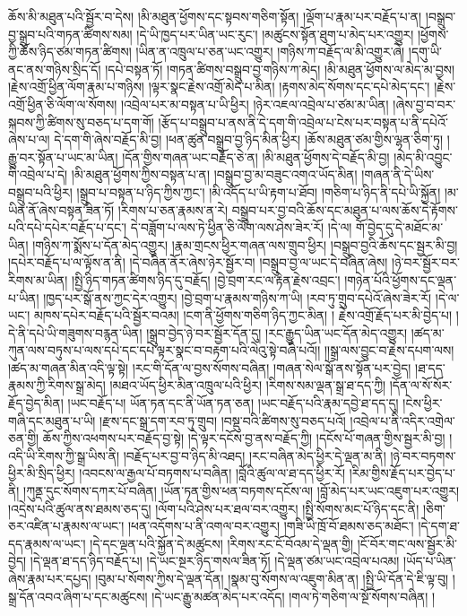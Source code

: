 ཆོས་མི་མཐུན་པའི་སྦྱོར་བ་དེས། །མི་མཐུན་ཕྱོགས་དང་སྟབས་གཅིག་སྟོན། །ལྡོག་པ་རྣམ་པར་བརྗོད་པ་ན། །བསྒྲུབ་བྱ་སྒྲུབ་པའི་གཏན་ཚིགས་སམ། །དེ་ཡི་ཁྱད་པར་ཡིན་ཡང་རུང་། །མཚུངས་སྟོན་ཐུག་པ་མེད་པར་འགྱུར། །ཕྱོགས་ཀྱི་ཆོས་ཉིད་ཙམ་གཏན་ཚིགས། །ཡིན་ན་འཁྲུལ་པ་ཅན་ཡང་འགྱུར། །གཉིས་ཀ་བརྗོད་ལ་མི་འགྱུར་ཞེ། །དགུ་ཡི་ནང་ནས་གཉིས་སྲིད་དོ། །དཔེ་བསྟན་ཏོ། །གཏན་ཚིགས་བསྒྲུབ་བྱ་གཉིས་ཀ་མེད། །མི་མཐུན་ཕྱོགས་ལ་མེད་མ་བྱས། །རྗེས་འགྲོ་ཕྱིན་ལོག་རྣམ་པ་གཉིས། །ལྟར་སྣང་རྗེས་འགྲོ་མེད་པ་མིན། །རྟགས་མེད་སོགས་དང་དཔེ་མེད་དང་། །རྗེས་འགྲོ་ཕྱིན་ཅི་ལོག་ལ་སོགས། །འབྲེལ་པར་མ་བསྟན་པ་ཡི་ཕྱིར། །ཉེར་འཇལ་འབྲེལ་པ་ཙམ་མ་ཡིན། །ཞེས་བྱ་བ་བར་སྐབས་ཀྱི་ཚིགས་སུ་བཅད་པ་དག་གོ། །རྩོད་པ་བསྒྲུབ་པ་ནས་ནི་དེ་དག་གི་འབྲེལ་པ་ངེས་པར་བསྟན་པ་ནི་དཔེའོ་ཞེས་པ་ལ། དེ་དག་གི་ཞེས་བརྗོད་མི་བྱ། །ཕན་ཚུན་བསྒྲུབ་བྱ་ཉིད་མིན་ཕྱིར། །ཆོས་མཐུན་ཙམ་གྱིས་ལྷན་ཅིག་ཏུ། །རྒྱུ་བར་སྟོན་པ་ཡང་མ་ཡིན། །དོན་གྱིས་གཞན་ཡང་བརྗོད་ཅེ་ན། །མི་མཐུན་ཕྱོགས་དེ་བརྗོད་མི་བྱ། །མེད་མི་འབྱུང་གི་འབྲེལ་པ་དེ། །མི་མཐུན་ཕྱོགས་ཀྱིས་བསྟན་པ་ན། །བསྒྲུབ་བྱ་མ་བཟུང་འགའ་ཡོད་མིན། །གཞན་ནི་དེ་ཡིས་བསྒྲུབ་པའི་ཕྱིར། །སྒྲུབ་པ་བསྟན་པ་ཉིད་ཀྱིས་ཀྱང་། །མི་འདོད་པ་ཡི་རྟག་པ་ཐོབ། །གཅིག་པ་ཉིད་ནི་དཔེ་ཡི་སྐྱོན། །མ་ཡིན་ནོ་ཞེས་བསྟན་ཟིན་ཏོ། །རིགས་པ་ཅན་རྣམས་ན་རེ། བསྒྲུབ་པར་བྱ་བའི་ཆོས་དང་མཐུན་པ་ལས་ཆོས་དེ་རྟོགས་པའི་དཔེ་དཔེར་བརྗོད་པ་དང་། དེ་བཟློག་པ་ལས་ཏེ་ཕྱིན་ཅི་ལོག་ལས་ཤེས་ཟེར་རོ། །དེ་ལ། གོ་བྱེད་དུ་དེ་མཐོང་མ་ཡིན། །གཉིས་ཀ་སྨོས་པ་དོན་མེད་འགྱུར། །རྣམ་གྲངས་ཕྱིར་གཞན་ལས་གྲུབ་ཕྱིར། །བསྒྲུབ་བྱའི་ཆོས་དང་སྦྱར་མི་བྱ། །དཔེར་བརྗོད་པ་ལ་ལྟོས་ན་ནི། །དེ་བཞིན་ནོར་ཞེས་ཉེར་སྦྱོར་བ། །བསྒྲུབ་བྱ་ལ་ཡང་དེ་བཞིན་ཞེས། །ཉེ་བར་སྦྱོར་བར་རིགས་མ་ཡིན། །སྤྱི་ཉིད་གཏན་ཚིགས་ཉིད་དུ་བརྗོད། །བྱེ་བྲག་རང་ལ་རྟེན་རྗེས་འབྲང་། །གཉེན་པོའི་ཕྱོགས་དང་ལྡན་པ་ཡིན། །ཁྱད་པར་སྒོ་ནས་ཀྱང་དེར་འགྱུར། །བྱེ་བྲག་པ་རྣམས་གཉིས་ཀ་ཡི། །རབ་ཏུ་གྲུབ་དཔེའོ་ཞེས་ཟེར་རོ། །དེ་ལ་ཡང་། མཁས་དཔེར་བརྗོད་པའི་སྦྱོར་བའམ། །ངག་ནི་ཕྱོགས་གཅིག་ཉིད་ཀྱང་མིན། །
རྗེས་འགྲོ་རྗོད་པར་མི་བྱེད་པ། །དེ་ནི་དཔེ་ཡི་གཟུགས་བརྙན་ཡིན། །སྒྲུབ་བྱེད་ཉེ་བར་སྦྱོར་དོན་དུ། །རང་རྒྱུད་ཡིན་ཡང་དོན་མེད་འགྱུར། །ཚད་མ་ཀུན་ལས་བཏུས་པ་ལས་དཔེ་དང་དཔེ་ལྟར་སྣང་བ་བརྟག་པའི་ལེའུ་སྟེ་བཞི་པའོ།། །།སྒྲ་ལས་བྱུང་བ་རྗེས་དཔག་ལས། །ཚད་མ་གཞན་མིན་འདི་ལྟ་སྟེ། །རང་གི་དོན་ལ་བྱས་སོགས་བཞིན། །གཞན་སེལ་སྒོ་ནས་སྟོན་པར་བྱེད། །ཐ་དད་རྣམས་ཀྱི་རིགས་སྒྲ་མེད། །མཐའ་ཡོད་ཕྱིར་མིན་འཁྲུལ་པའི་ཕྱིར། །རིགས་སམ་ལྡན་སྒྲ་ཐ་དད་ཀྱི། །དོན་ལ་སོ་སོར་རྗོད་བྱེད་མིན། །ཡང་བརྗོད་པ། ཡོན་ཏན་དང་ནི་ཡོན་ཏན་ཅན། །ཡང་བརྗོད་པའི་རྣམ་དབྱེ་ཐ་དད་དུ། །ངེས་ཕྱིར་གཞི་དང་མཐུན་པ་ཡི། །རྫས་དང་སྒྲ་དག་རབ་ཏུ་གྲུབ། །བསྡུ་བའི་ཚིགས་སུ་བཅད་པའོ། །འབྲེལ་པ་ནི་འདིར་འགྲེལ་ཅན་གྱི། ཆོས་ཀྱིས་འཕགས་པར་བརྗོད་བྱ་སྟེ། །དེ་ལྟར་དངོས་བྱ་ནས་བརྗོད་ཀྱི། །དངོས་པོ་གཞན་གྱིས་སྦྱར་མི་བྱ། །འདི་ཡི་རིགས་ཀྱི་སྒྲ་ཡིས་ནི། །བརྗོད་པར་བྱ་བ་ཉིད་མི་འཐད། །རང་བཞིན་མེད་ཕྱིར་དེ་ལྡན་མ་ནི། །ཉེ་བར་བཏགས་ཕྱིར་མི་སྲིད་ཕྱིར། །འབངས་ལ་རྒྱལ་པོ་བཏགས་པ་བཞིན། །བློའི་ཚུལ་ལ་ཐ་དད་ཕྱིར་རོ། །རིམ་གྱིས་རྗོད་པར་བྱེད་པ་ནི། །ཀུནྡ་དུང་སོགས་དཀར་པོ་བཞིན། །ཡོན་ཏན་གྱིས་ཕན་བཏགས་དངོས་ལ། །བློ་མེད་པར་ཡང་འཇུག་པར་འགྱུར། །འདྲེས་པའི་ཚུལ་ནས་ཐམས་ཅད་དུ། །ལོག་པའི་ཤེས་པར་ཐལ་བར་འགྱུར། །སྤྱི་སོགས་མང་པོ་ཉིད་དང་ནི། །ཅིག་ཅར་འཛིན་པ་རྣམས་ལ་ཡང་། །ཕན་འདོགས་པ་ནི་འགལ་བར་འགྱུར། །གཟི་ཡི་ཁྲོ་བོ་ཐམས་ཅད་མཐོང་། །དེ་དག་ཐ་དད་རྣམས་ལ་ཡང་། །དེ་དང་ལྡན་པའི་སྐྱོན་དེ་མཚུངས། །རིགས་རང་ངོ་བོའམ་དེ་ལྡན་གྱི། །ངོ་བོར་གང་ལས་སྦྱོར་མི་བྱེད། །དེ་ལྡན་ཐ་དད་ཉིད་བརྗོད་པ། །དེ་ཡང་སྔར་ཉིད་གསལ་ཟིན་ཏོ། །དེ་ལྡན་ཙམ་ཡང་འབྲེལ་པའམ། །ཡོད་པ་ཡིན་ཞེས་རྣམ་པར་དཔྱད། །བུམ་པ་སོགས་ཀྱིས་དེ་ལྡན་དོན། །སྣམ་བུ་སོགས་ལ་འཇུག་མིན་ན། །སྤྱི་ཡི་དོན་དེ་ཇི་ལྟ་བུ། །སྒྲ་དོན་འབའ་ཞིག་པ་དང་མཚུངས། །དེ་ཡང་རྒྱུ་མཚན་མེད་པར་འདོད། །གལ་ཏེ་གཅིག་ལ་སྔོ་སོགས་བཞིན། །
